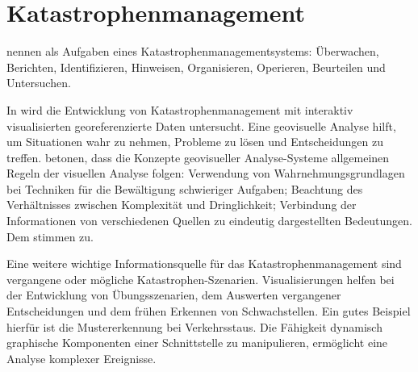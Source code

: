 
\section{Katastrophenmanagement}

\cite{yuan_intelligent_2005} nennen als Aufgaben eines Katastrophenmanagementsystems: Überwachen, Berichten, Identifizieren, Hinweisen, Organisieren, Operieren, Beurteilen und Untersuchen.

In \cite{tomaszewski_geovisual_2007} wird die Entwicklung von Katastrophenmanagement mit interaktiv visualisierten georeferenzierte Daten untersucht. Eine geovisuelle Analyse hilft, um Situationen wahr zu nehmen, Probleme zu lösen und Entscheidungen zu treffen. \citep{thomas_illuminating_2005} betonen, dass die Konzepte geovisueller Analyse-Systeme allgemeinen Regeln der visuellen Analyse folgen: Verwendung von Wahrnehmungsgrundlagen bei Techniken für die Bewältigung schwieriger Aufgaben; Beachtung des Verhältnisses zwischen Komplexität und Dringlichkeit; Ver\-bindung der Informationen von verschiedenen Quellen zu eindeutig dargestellten Bedeutungen. Dem stimmen \citeauthor{tomaszewski_geovisual_2007} zu.

Eine weitere wichtige Informationsquelle für das Katastrophenmanagement sind vergangene oder mögliche Katastrophen-Szenarien. Visualisierungen helfen bei der Entwicklung von Übungsszenarien, dem Auswerten vergangener Entscheidungen und dem frühen Erkennen von Schwachstellen. Ein gutes Beispiel hierfür ist die Mustererkennung bei Verkehrsstaus. Die Fähigkeit dynamisch graphische Komponenten einer Schnittstelle zu manipulieren, ermöglicht eine Analyse komplexer Ereignisse. \citep{tomaszewski_geovisual_2007}